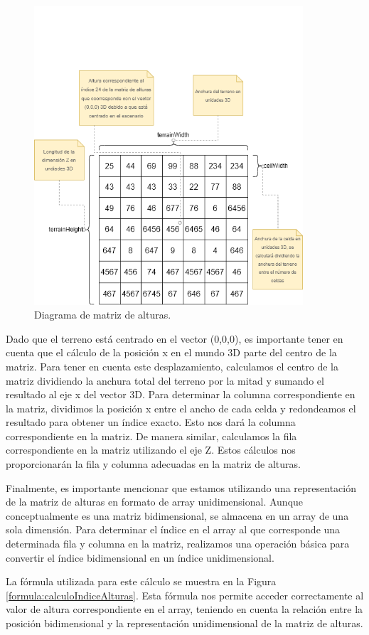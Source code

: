 \documentclass[a4paper, 11pt]{book}
\begin{document}
\begin{figure}[H]
  \centering
  \includegraphics[width=10cm, keepaspectratio]{img/terrain.drawio.png}
  \caption{Diagrama de matriz de alturas.}
  \label{fig:terrainDrawio}
\end{figure}
Dado que el terreno está centrado en el vector (0,0,0), es importante tener en cuenta que el cálculo de la posición x en el mundo 3D parte del centro de la matriz. Para tener en cuenta este desplazamiento, calculamos el centro de la matriz dividiendo la anchura total del terreno por la mitad y sumando el resultado al eje x del vector 3D. Para determinar la columna correspondiente en la matriz, dividimos la posición x entre el ancho de cada celda y redondeamos el resultado para obtener un índice exacto. Esto nos dará la columna correspondiente en la matriz. 
De manera similar, calculamos la fila correspondiente en la matriz utilizando el eje Z. Estos cálculos nos proporcionarán la fila y columna adecuadas en la matriz de alturas.

Finalmente, es importante mencionar que estamos utilizando una representación de la matriz de alturas en formato de array unidimensional. Aunque conceptualmente es una matriz bidimensional, se almacena en un array de una sola dimensión. Para determinar el índice en el array al que corresponde una determinada fila y columna en la matriz, realizamos una operación básica para convertir el índice bidimensional en un índice unidimensional.

La fórmula utilizada para este cálculo se muestra en la Figura \ref{formula:calculoIndiceAlturas}. Esta fórmula nos permite acceder correctamente al valor de altura correspondiente en el array, teniendo en cuenta la relación entre la posición bidimensional y la representación unidimensional de la matriz de alturas.
\end{document}
